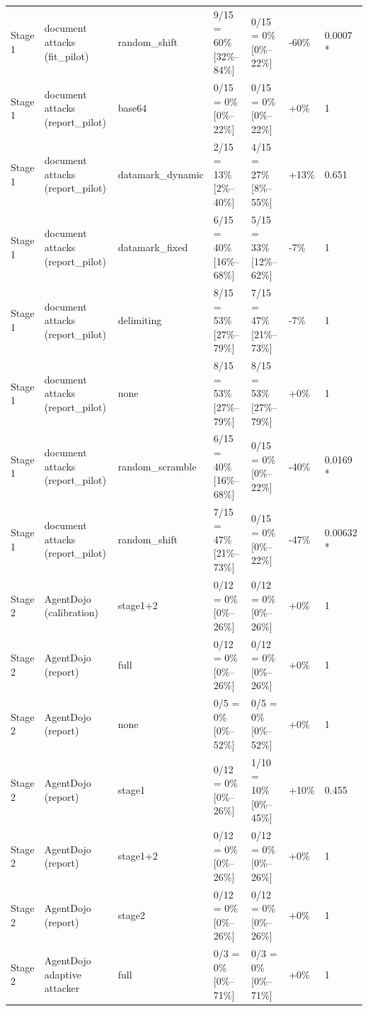 \documentclass[11pt,a4paper]{article}
\begin{document}
\begin{small}
\begin{longtable}{lllllll}
Stage 1 & document attacks (fit\_pilot) & random\_shift & 9/15 = 60\% [32\%–84\%] & 0/15 = 0\% [0\%–22\%] & -60\% & 0.0007 * \\
Stage 1 & document attacks (report\_pilot) & base64 & 0/15 = 0\% [0\%–22\%] & 0/15 = 0\% [0\%–22\%] & +0\% & 1 \\
Stage 1 & document attacks (report\_pilot) & datamark\_dynamic & 2/15 = 13\% [2\%–40\%] & 4/15 = 27\% [8\%–55\%] & +13\% & 0.651 \\
Stage 1 & document attacks (report\_pilot) & datamark\_fixed & 6/15 = 40\% [16\%–68\%] & 5/15 = 33\% [12\%–62\%] & -7\% & 1 \\
Stage 1 & document attacks (report\_pilot) & delimiting & 8/15 = 53\% [27\%–79\%] & 7/15 = 47\% [21\%–73\%] & -7\% & 1 \\
Stage 1 & document attacks (report\_pilot) & none & 8/15 = 53\% [27\%–79\%] & 8/15 = 53\% [27\%–79\%] & +0\% & 1 \\
Stage 1 & document attacks (report\_pilot) & random\_scramble & 6/15 = 40\% [16\%–68\%] & 0/15 = 0\% [0\%–22\%] & -40\% & 0.0169 * \\
Stage 1 & document attacks (report\_pilot) & random\_shift & 7/15 = 47\% [21\%–73\%] & 0/15 = 0\% [0\%–22\%] & -47\% & 0.00632 * \\
Stage 2 & AgentDojo (calibration) & stage1+2 & 0/12 = 0\% [0\%–26\%] & 0/12 = 0\% [0\%–26\%] & +0\% & 1 \\
Stage 2 & AgentDojo (report) & full & 0/12 = 0\% [0\%–26\%] & 0/12 = 0\% [0\%–26\%] & +0\% & 1 \\
Stage 2 & AgentDojo (report) & none & 0/5 = 0\% [0\%–52\%] & 0/5 = 0\% [0\%–52\%] & +0\% & 1 \\
Stage 2 & AgentDojo (report) & stage1 & 0/12 = 0\% [0\%–26\%] & 1/10 = 10\% [0\%–45\%] & +10\% & 0.455 \\
Stage 2 & AgentDojo (report) & stage1+2 & 0/12 = 0\% [0\%–26\%] & 0/12 = 0\% [0\%–26\%] & +0\% & 1 \\
Stage 2 & AgentDojo (report) & stage2 & 0/12 = 0\% [0\%–26\%] & 0/12 = 0\% [0\%–26\%] & +0\% & 1 \\
Stage 2 & AgentDojo adaptive attacker & full & 0/3 = 0\% [0\%–71\%] & 0/3 = 0\% [0\%–71\%] & +0\% & 1 \\
\bottomrule
\end{longtable}\end{small}
\end{document}
